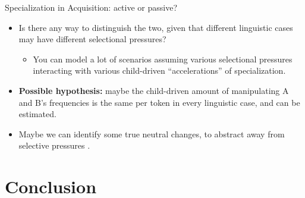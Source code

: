 \documentclass[hyperref={pdfpagelabels=false}]{beamer}
\begin{document}
\begin{frame}{Specialization in Acquisition: active or passive?}
		\begin{itemize}
			\item Is there any way to distinguish the two, given that different linguistic cases may have different selectional pressures?
				\begin{itemize}
					\item You can model a lot of scenarios assuming various selectional pressures interacting with various child-driven ``accelerations'' of specialization.
				\end{itemize}
			\item \textbf{Possible hypothesis:} maybe the child-driven amount of manipulating A and B's frequencies is the same per token in every linguistic case, and can be estimated.
			\item Maybe we can identify some true neutral changes, to abstract away from selective pressures \citep{kauhanen2016}.
		\end{itemize}
\end{frame}

		







\section{Conclusion}
\end{document}
